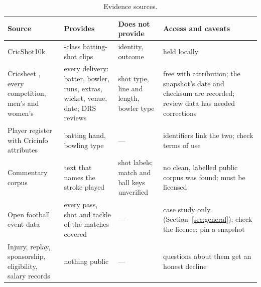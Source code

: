\documentclass[11pt,a4paper]{article}
\begin{document}
\begin{table}[htbp]
\centering
\footnotesize
\renewcommand{\arraystretch}{1.25}
\begin{tabular}{@{}>{\raggedright\arraybackslash}p{3.3cm}
                  >{\raggedright\arraybackslash}p{4.5cm}
                  >{\raggedright\arraybackslash}p{3.0cm}
                  >{\raggedright\arraybackslash}p{4.2cm}@{}}
\toprule
\textbf{Source} & \textbf{Provides} & \textbf{Does not provide} & \textbf{Access and caveats} \\
\midrule
CricShot10k \cite{cricshot10k} & 15-class batting-shot clips & identity, outcome & held locally \\
Cricsheet \cite{cricsheet}, every competition, men's and women's & every delivery: batter, bowler, runs, extras, wicket, venue, date; DRS reviews & shot type, line and length, bowler type & free with attribution; the snapshot's date and checksum are recorded; review data has needed corrections \cite{cricsheetreview} \\
Player register with Cricinfo attributes \cite{cricketdata} & batting hand, bowling type & --- & identifiers link the two; check terms of use \\
Commentary corpus & text that names the stroke played & shot labels; match and ball keys unverified & no clean, labelled public corpus was found; must be licensed \\
Open football event data \cite{statsbomb} & every pass, shot and tackle of the matches covered & --- & case study only (Section~\ref{sec:general}); check the licence; pin a snapshot \\
Injury, replay, sponsorship, eligibility, salary records & nothing public & --- & questions about them get an honest decline \\
\bottomrule
\end{tabular}
\caption{Evidence sources.}
\label{tab:data}
\end{table}
\end{document}
